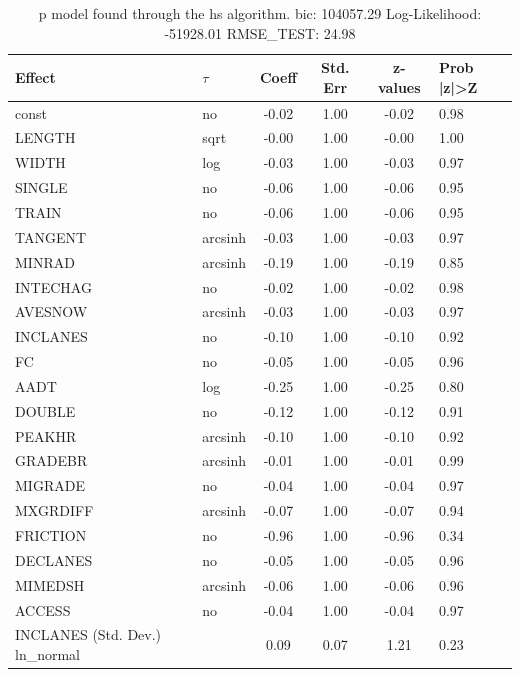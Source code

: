 \begin{table}
	\caption{p model found through the hs algorithm. bic: 104057.29 Log-Likelihood: -51928.01 RMSE_TEST: 24.98}
	\begin{center}
		\begin{tabular}{|l|l|c|c|c|l|}
			\hline
			Effect & $\tau$ & Coeff & Std. Err & z-values & Prob |z|>Z \\
			\hline
			const & no & -0.02 & 1.00 & -0.02 & 0.98 \\
			\hline
			LENGTH & sqrt & -0.00 & 1.00 & -0.00 & 1.00 \\
			\hline
			WIDTH & log & -0.03 & 1.00 & -0.03 & 0.97 \\
			\hline
			SINGLE & no & -0.06 & 1.00 & -0.06 & 0.95 \\
			\hline
			TRAIN & no & -0.06 & 1.00 & -0.06 & 0.95 \\
			\hline
			TANGENT & arcsinh & -0.03 & 1.00 & -0.03 & 0.97 \\
			\hline
			MINRAD & arcsinh & -0.19 & 1.00 & -0.19 & 0.85 \\
			\hline
			INTECHAG & no & -0.02 & 1.00 & -0.02 & 0.98 \\
			\hline
			AVESNOW & arcsinh & -0.03 & 1.00 & -0.03 & 0.97 \\
			\hline
			INCLANES & no & -0.10 & 1.00 & -0.10 & 0.92 \\
			\hline
			FC & no & -0.05 & 1.00 & -0.05 & 0.96 \\
			\hline
			AADT & log & -0.25 & 1.00 & -0.25 & 0.80 \\
			\hline
			DOUBLE & no & -0.12 & 1.00 & -0.12 & 0.91 \\
			\hline
			PEAKHR & arcsinh & -0.10 & 1.00 & -0.10 & 0.92 \\
			\hline
			GRADEBR & arcsinh & -0.01 & 1.00 & -0.01 & 0.99 \\
			\hline
			MIGRADE & no & -0.04 & 1.00 & -0.04 & 0.97 \\
			\hline
			MXGRDIFF & arcsinh & -0.07 & 1.00 & -0.07 & 0.94 \\
			\hline
			FRICTION & no & -0.96 & 1.00 & -0.96 & 0.34 \\
			\hline
			DECLANES & no & -0.05 & 1.00 & -0.05 & 0.96 \\
			\hline
			MIMEDSH & arcsinh & -0.06 & 1.00 & -0.06 & 0.96 \\
			\hline
			ACCESS & no & -0.04 & 1.00 & -0.04 & 0.97 \\
			\hline
			INCLANES (Std. Dev.) ln_normal &  & 0.09 & 0.07 & 1.21 & 0.23 \\

\end{tabular}
\end{center}
\end{table}
